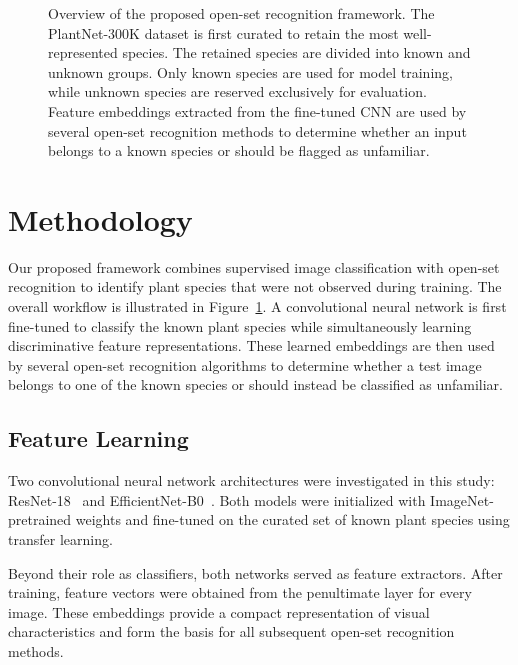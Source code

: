 \documentclass[11pt]{article}
\begin{document}
\begin{figure}[H]

\caption{Overview of the proposed open-set recognition framework. The PlantNet-300K dataset is first curated to retain the most well-represented species. The retained species are divided into known and unknown groups. Only known species are used for model training, while unknown species are reserved exclusively for evaluation. Feature embeddings extracted from the fine-tuned CNN are used by several open-set recognition methods to determine whether an input belongs to a known species or should be flagged as unfamiliar.}
\label{fig:pipeline}
\end{figure}


\section{Methodology}

Our proposed framework combines supervised image classification with open-set recognition to identify plant species that were not observed during training. The overall workflow is illustrated in Figure~\ref{fig:pipeline}. A convolutional neural network is first fine-tuned to classify the known plant species while simultaneously learning discriminative feature representations. These learned embeddings are then used by several open-set recognition algorithms to determine whether a test image belongs to one of the known species or should instead be classified as unfamiliar.

\subsection{Feature Learning}

Two convolutional neural network architectures were investigated in this study: ResNet-18~\cite{he2016deep} and EfficientNet-B0~\cite{tan2019efficientnet}. Both models were initialized with ImageNet-pretrained weights and fine-tuned on the curated set of known plant species using transfer learning.

Beyond their role as classifiers, both networks served as feature extractors. After training, feature vectors were obtained from the penultimate layer for every image. These embeddings provide a compact representation of visual characteristics and form the basis for all subsequent open-set recognition methods.
\end{document}
